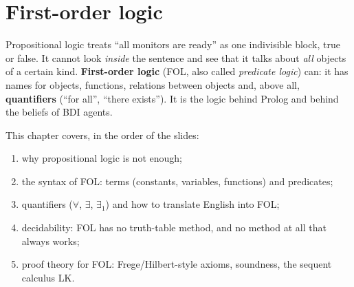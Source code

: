 \section{First-order logic}
\label{sec:first-order-logic}

Propositional logic treats ``all monitors are ready'' as one indivisible block, true or
false. It cannot look \emph{inside} the sentence and see that it talks about \emph{all}
objects of a certain kind. \textbf{First-order logic} (FOL, also called \emph{predicate
logic}) can: it has names for objects, functions, relations between objects and, above
all, \textbf{quantifiers} (``for all'', ``there exists''). It is the logic behind Prolog
and behind the beliefs of BDI agents.

This chapter covers, in the order of the slides:
\begin{enumerate}[nosep]
  \item why propositional logic is not enough;
  \item the syntax of FOL: terms (constants, variables, functions) and predicates;
  \item quantifiers ($\forall$, $\exists$, $\exists_1$) and how to translate English into FOL;
  \item decidability: FOL has no truth-table method, and no method at all that always works;
  \item proof theory for FOL: Frege/Hilbert-style axioms, soundness, the sequent calculus LK.
\end{enumerate}







